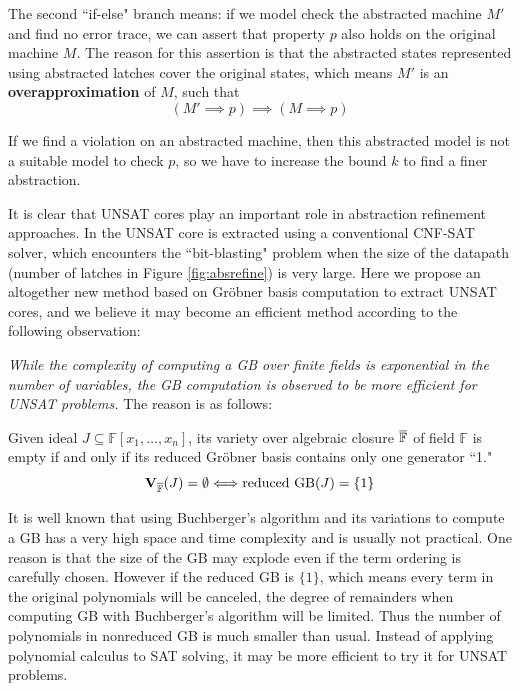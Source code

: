 The second ``if-else" branch means: if we model check the abstracted machine $M'$ and find no
error trace, we can assert that property $p$ also holds on the original machine $M$. The reason for this assertion is that
the abstracted states represented using abstracted latches cover the original states, which means $M'$ is an {\bf overapproximation}
of $M$, such that 
$$(M'\implies p) \implies (M\implies p)$$ 

If we find a violation on an abstracted machine, then this
abstracted model is not a suitable model to check $p$, so we have to increase the bound $k$ to find a finer abstraction.

It is clear that UNSAT cores play an important role in abstraction refinement approaches. In \cite{zhang2005design}
the UNSAT core is extracted using a conventional CNF-SAT solver, which encounters the ``bit-blasting" problem
when the size of the datapath (number of latches in Figure \ref{fig:absrefine}) is very large. Here we propose an altogether new 
method based on Gr\"obner basis computation to extract UNSAT cores, and we believe it may become an efficient 
method according to the following observation:

{\it While the complexity of computing a GB over finite fields is exponential in the number of variables,
the GB  computation is observed to be more efficient for UNSAT problems.} 
The reason is as follows:
\begin{Theorem}
Given ideal $J\subseteq \mathbb F[x_1,\dots,x_n]$, its variety over algebraic closure $\overline{{\mathbb{F}}}$
of field $\mathbb F$ is empty if and only if its reduced Gr\"obner basis contains only one generator ``1."
$${\bf V}_{\overline{\mathbb F}}(J) = \emptyset \Longleftrightarrow \text{reduced GB}(J) = \{1\}$$
\end{Theorem}
It is well known that using Buchberger's algorithm and its variations to compute a GB has a very high space and
time complexity and is usually not practical. One reason is that the size of the GB may explode even if the term
ordering is carefully chosen. However if the reduced GB is $\{1\}$, which means every term in the original polynomials
will be canceled, the degree of remainders when computing GB with Buchberger's algorithm will be limited. 
Thus the number of polynomials in nonreduced GB is much smaller than usual.
Instead of applying polynomial calculus to SAT solving, it may be more efficient to try it for UNSAT
problems.

